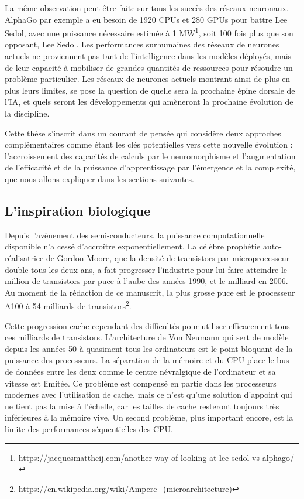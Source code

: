 	La même observation peut être faite sur tous les succès des réseaux neuronaux. AlphaGo par exemple a eu besoin de 1920 CPUs et 280 GPUs pour battre Lee Sedol, avec une puissance nécessaire estimée à 1 MW\footnote{https://jacquesmattheij.com/another-way-of-looking-at-lee-sedol-vs-alphago/}, soit 100 fois plus que son opposant, Lee Sedol. Les performances surhumaines des réseaux de neurones actuels ne proviennent pas tant de l'intelligence dans les modèles déployés, mais de leur capacité à mobiliser de grandes quantités de ressources pour résoudre un problème particulier. Les réseaux de neurones actuels montrant ainsi de plus en plus leurs limites, se pose la question de quelle sera la prochaine épine dorsale de l'IA, et quels seront les développements qui amèneront la prochaine évolution de la discipline. 
	
	Cette thèse s'inscrit dans un courant de pensée qui considère deux approches complémentaires comme étant les clés potentielles vers cette nouvelle évolution : l'accroissement des capacités de calculs par le neuromorphisme et l'augmentation de l'efficacité et de la puissance d'apprentissage par l'émergence et la complexité, que nous allons expliquer dans les sections suivantes.

\subsection{L'inspiration biologique}

	Depuis l'avènement des semi-conducteurs, la puissance computationnelle disponible n'a cessé d'accroître exponentiellement. La célèbre prophétie auto-réalisatrice de Gordon Moore, que la densité de transistors par microprocesseur double tous les deux ans, a fait progresser l'industrie pour lui faire atteindre le million de transistors par puce à l'aube des années 1990, et le milliard en 2006. Au moment de la rédaction de ce manuscrit, la plus grosse puce est le processeur A100 à 54 milliards de transistors\footnote{https://en.wikipedia.org/wiki/Ampere\_(microarchitecture)}.

	Cette progression cache cependant des difficultés pour utiliser efficacement tous ces milliards de transistors. L'architecture de Von Neumann \cite{von1993first} qui sert de modèle depuis les années 50 à quasiment tous les ordinateurs est le point bloquant de la puissance des processeurs. La séparation de la mémoire et du CPU place le bus de données entre les deux comme le centre névralgique de l'ordinateur et sa vitesse est limitée. Ce problème est compensé en partie dans les processeurs modernes avec l'utilisation de cache, mais ce n'est qu'une solution d'appoint qui ne tient pas la mise à l'échelle, car les tailles de cache resteront toujours très inférieures à la mémoire vive. Un second problème, plus important encore, est la limite des performances séquentielles des CPU. 
	
